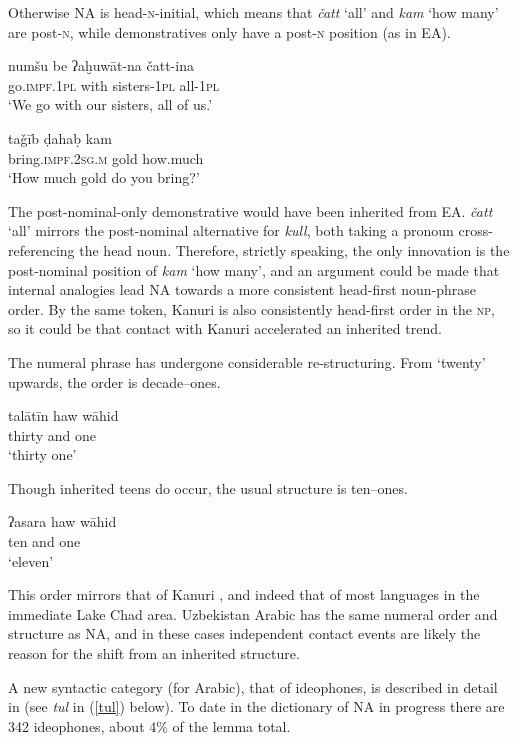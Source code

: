 \documentclass[output=paper]{langsci/langscibook}
\begin{document}
Otherwise NA is head-\textsc{n}-initial, which means that \textit{čatt} ‘all’ and \textit{kam} ‘how many’ are post-\textsc{n}, while demonstratives only have a post-\textsc{n} position (as in EA).

\ea \gll numšu be ʔaḫuwāt-na čatt-ina\\
     go.\textsc{impf.1pl} with sisters-1\textsc{pl} all-\textsc{1pl}\\
\glt ‘We go with our sisters, all of us.’
\z

\ea \gll taǧīb ḍahaḅ kam\\
     bring.\textsc{impf.2sg.m} gold how.much\\
\glt ‘How much gold do you bring?’
\z

The post-nominal-only demonstrative would have been inherited from EA. \textit{čatt} ‘all’ mirrors the post-nominal alternative for \textit{kull}, both taking a pronoun cross-referencing the head noun. Therefore, strictly speaking, the only innovation is the post-nominal position of \textit{kam} ‘how many’, and an argument could be made that internal analogies lead NA towards a more consistent head-first noun-phrase order. By the same token, Kanuri is also consistently head-first order in the \textsc{np}, so it could be that contact with Kanuri accelerated an inherited trend.

The numeral phrase has undergone considerable re-structuring. From `twenty' upwards, the order is decade--ones.

\ea \gll talātīn haw wāhid\\
     thirty and one\\
\glt ‘thirty one’
\z

Though inherited teens do occur, the usual structure is ten--ones.

\ea \gll ʔasara haw wāhid\\
     ten and one\\
\glt ‘eleven’
\z

This order mirrors that of Kanuri \citep[203]{Hutchison1981}, and indeed that of most languages in the immediate Lake Chad area. Uzbekistan Arabic has the same numeral order and structure as NA, and in these cases independent contact events are likely the reason for the shift from an inherited structure. 

A new syntactic category (for Arabic), that of ideophones, is described in detail in \citet{OwensHassan2004} (see \textit{tul} in (\ref{tul}) below). To date in the dictionary of NA in progress there are 342 ideophones, about 4\% of the lemma total.
\end{document}
